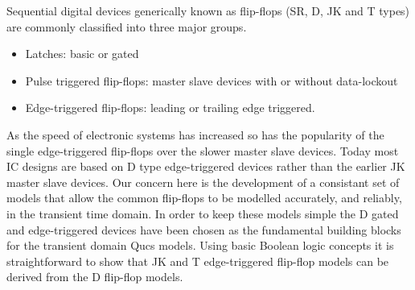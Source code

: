 Sequential digital devices generically known as flip-flops (SR, D, JK
and T types) are commonly classified into three major groups.
\begin{itemize}
\item
Latches: basic or gated 
\item
Pulse triggered flip-flops: master slave devices with or without data-lockout
\item
Edge-triggered flip-flops: leading or trailing edge triggered.
\end{itemize}

As the speed of electronic systems has increased so has the popularity
of the single edge-triggered flip-flops over the slower master slave
devices.  Today most IC designs are based on D type edge-triggered
devices rather than the earlier JK master slave devices. Our concern
here is the development of a consistant set of models that allow the
common flip-flops to be modelled accurately, and reliably, in the
transient time domain. In order to keep these models simple the D
gated and edge-triggered devices have been chosen as the fundamental
building blocks for the transient domain Qucs models. Using basic
Boolean logic concepts it is straightforward to show that JK and T
edge-triggered flip-flop models can be derived from the D flip-flop
models.


